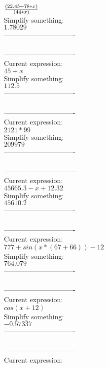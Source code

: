 \documentclass[12pt]{article}
\begin{document}
\( {{(22.45+78*x)}\over{(44*x)}}\) \\
Simplify something:\\
\( 1.78029\) \\
-------------------------------\\
\\
-------------------------------\\
Current expression:\\
\( 45+x\) \\
Simplify something:\\
\( 112.5\) \\
-------------------------------\\
\\
-------------------------------\\
Current expression:\\
\( 2121*99\) \\
Simplify something:\\
\( 209979\) \\
-------------------------------\\
\\
-------------------------------\\
Current expression:\\
\( 45665.3-x+12.32\) \\
Simplify something:\\
\( 45610.2\) \\
-------------------------------\\
\\
-------------------------------\\
Current expression:\\
\( 777+sin(x*(67+66))-12\) \\
Simplify something:\\
\( 764.079\) \\
-------------------------------\\
\\
-------------------------------\\
Current expression:\\
\( cos(x+12)\) \\
Simplify something:\\
\( -0.57337\) \\
-------------------------------\\
\\
-------------------------------\\
Current expression:\\
\end{document}
